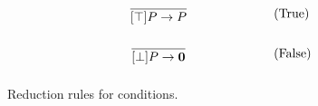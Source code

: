 \begin{figure}[h]
	\begin{align}
	& \infrule{}{[\top]P\ra P} \tag{True}\\
	& \infrule{}{[\bot]P\ra \nil} \tag{False}
	\end{align}
	\caption{Reduction rules for conditions.}
	\label{condition}
\end{figure}

%

\FloatBarrier


